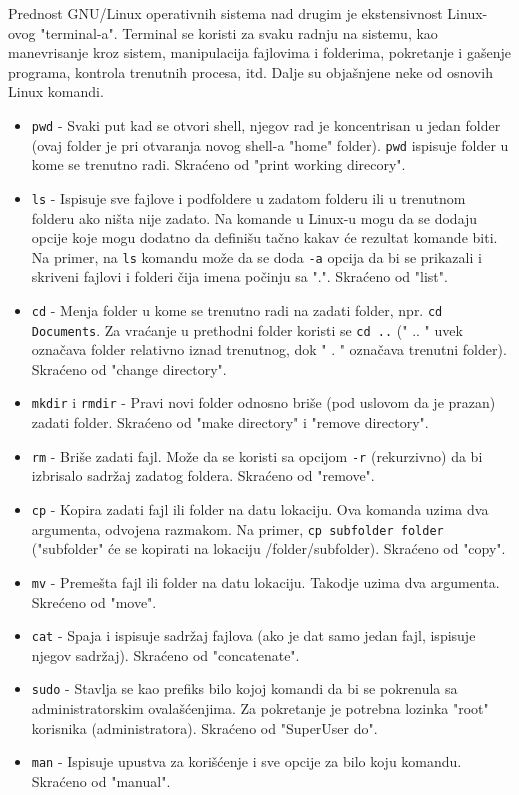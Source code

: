 Prednost GNU/Linux operativnih sistema nad drugim je ekstensivnost Linux-ovog "terminal-a". Terminal se koristi za svaku radnju na sistemu, kao manevrisanje kroz sistem, manipulacija fajlovima i folderima,  pokretanje i gašenje programa, kontrola trenutnih procesa, itd. Dalje su objašnjene neke od osnovih Linux komandi.
\begin{itemize}
\item \texttt{pwd} - Svaki put kad se otvori shell, njegov rad je koncentrisan u jedan folder (ovaj folder je pri otvaranja novog shell-a "home" folder). \texttt{pwd} ispisuje folder u kome se trenutno radi. Skraćeno od "print working direcory". 

\item \texttt{ls} - Ispisuje sve fajlove i podfoldere u zadatom folderu ili u trenutnom folderu ako ništa nije zadato. Na komande u Linux-u mogu da se dodaju opcije koje mogu dodatno da definišu tačno kakav će rezultat komande biti. Na primer, na \texttt{ls} komandu može da se doda \texttt{-a} opcija da bi se prikazali i skriveni fajlovi i folderi čija imena počinju sa ".". Skraćeno od "list".

\item \texttt{cd} - Menja folder u kome se trenutno radi na zadati folder, npr. \texttt{cd Documents}. Za vraćanje u prethodni folder koristi se \texttt{cd ..} (" .. " uvek označava folder relativno iznad trenutnog, dok " . " označava trenutni folder). Skraćeno od "change directory".

\item \texttt{mkdir} i \texttt{rmdir} - Pravi novi folder odnosno briše (pod uslovom da je prazan) zadati folder. Skraćeno od "make directory" i "remove directory".

\item \texttt{rm} - Briše zadati fajl. Može da se koristi sa opcijom \texttt{-r} (rekurzivno) da bi izbrisalo sadržaj zadatog foldera. Skraćeno od "remove".

\item \texttt{cp} - Kopira zadati fajl ili folder na datu lokaciju. Ova komanda uzima dva argumenta, odvojena razmakom. Na primer, \texttt{cp subfolder folder} ("subfolder" će se kopirati na lokaciju /folder/subfolder). Skraćeno od "copy".

\item \texttt{mv} - Premešta fajl ili folder na datu lokaciju. Takodje uzima dva argumenta. Skrećeno od "move".

\item \texttt{cat} 	- Spaja i ispisuje sadržaj fajlova (ako je dat samo jedan fajl, ispisuje njegov sadržaj). Skraćeno od "concatenate".

\item \texttt{sudo} - Stavlja se kao prefiks bilo kojoj komandi da bi se pokrenula sa administratorskim ovalašćenjima. Za pokretanje je potrebna lozinka "root" korisnika (administratora). Skraćeno od "SuperUser do".

\item \texttt{man} - Ispisuje upustva za korišćenje i sve opcije za bilo koju komandu. Skraćeno od "manual".
\end{itemize}